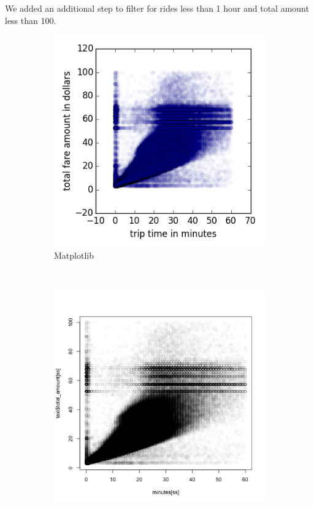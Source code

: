 \documentclass[]{article}
\begin{document}
We added an additional step to filter for rides less than 1 hour and
total amount less than 100.

\begin{figure}
        \centering
        \begin{subfigure}[b]{0.3\textwidth}
                \includegraphics[width=\textwidth]{matplotlib/alpha2.png}
                \caption{Matplotlib}
        \end{subfigure}%
        ~ %
        \begin{subfigure}[b]{0.3\textwidth}
                \includegraphics[width=\textwidth]{R/alpha2.png}

\end{subfigure}
\end{figure}
\end{document}
